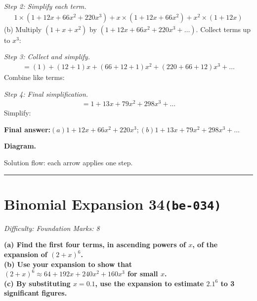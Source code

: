 \documentclass[11pt]{article}
\newcommand{\question}[1]{\par\medskip\noindent\textbf{#1}\par}
\begin{document}
\textit{Step 2: Simplify each term.}
\[\begin{gathered}
1 \times (1 + 12x + 66x^2 + 220x^3) + x \times (1 + 12x + 66x^2) + x^2 \times (1 + 12x)
\end{gathered}\]
(b) Multiply \((1 + x + x^2)\) by \((1 + 12x + 66x^2 + 220x^3 + \ldots)\). Collect terms up to \(x^3\):

\textit{Step 3: Collect and simplify.}
\[\begin{gathered}
= (1) + (12 + 1)x + (66 + 12 + 1)x^2 + (220 + 66 + 12)x^3 + \ldots
\end{gathered}\]
Combine like terms:

\textit{Step 4: Final simplification.}
\[\begin{gathered}
= 1 + 13x + 79x^2 + 298x^3 + \ldots
\end{gathered}\]
Simplify:

\begin{answerbox}
\textbf{Final answer:}\quad \(\displaystyle (a) 1 + 12x + 66x^2 + 220x^3; (b) 1 + 13x + 79x^2 + 298x^3 + \ldots\)
\end{answerbox}
\textbf{Diagram.}

\begin{center}
\end{center}
\small Solution flow: each arrow applies one step.\normalsize

\medskip\hrule

\section*{Binomial Expansion 34\quad\small\texttt{(be-034)}}
\textit{Difficulty: Foundation \quad\textbar\quad Marks: 8}

\question{(a) Find the first four terms, in ascending powers of \( x \), of the expansion of \( (2 + x)^6 \). \\[3pt] (b) Use your expansion to show that \( (2 + x)^6 \approx 64 + 192x + 240x^2 + 160x^3 \) for small \( x \). \\[3pt] (c) By substituting \( x = 0.1 \), use the expansion to estimate \( 2.1^6 \) to 3 significant figures.}
\end{document}
